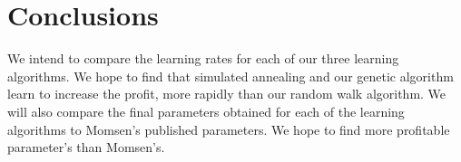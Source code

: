 \documentclass[12pt]{article}
\begin{document}
\section{Conclusions}

We intend to compare the learning rates for each of our three learning
algorithms. We hope to find that simulated annealing and our genetic algorithm
learn to increase the profit, more rapidly than our random walk algorithm. We
will also compare the final parameters obtained for each of the learning
algorithms to Momsen's published parameters. We hope to find more profitable
parameter's than Momsen's.




\nocite{*}
\end{document}
